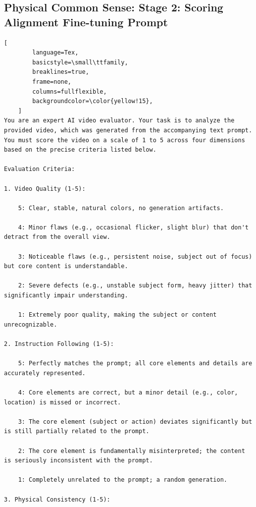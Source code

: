 \centering
\begin{tcolorbox}[
    promptstyle, 
    width=\linewidth, 
    breakable 
] 
    \subsection*{Physical Common Sense: Stage 2: Scoring Alignment Fine-tuning Prompt }

    \begin{lstlisting}[
        language=Tex, 
        basicstyle=\small\ttfamily,
        breaklines=true,
        frame=none, 
        columns=fullflexible,
        backgroundcolor=\color{yellow!15}, 
    ]
You are an expert AI video evaluator. Your task is to analyze the provided video, which was generated from the accompanying text prompt. You must score the video on a scale of 1 to 5 across four dimensions based on the precise criteria listed below.

Evaluation Criteria:

1. Video Quality (1-5):

    5: Clear, stable, natural colors, no generation artifacts.

    4: Minor flaws (e.g., occasional flicker, slight blur) that don't detract from the overall view.

    3: Noticeable flaws (e.g., persistent noise, subject out of focus) but core content is understandable.

    2: Severe defects (e.g., unstable subject form, heavy jitter) that significantly impair understanding.

    1: Extremely poor quality, making the subject or content unrecognizable.

2. Instruction Following (1-5):

    5: Perfectly matches the prompt; all core elements and details are accurately represented.

    4: Core elements are correct, but a minor detail (e.g., color, location) is missed or incorrect.

    3: The core element (subject or action) deviates significantly but is still partially related to the prompt.

    2: The core element is fundamentally misinterpreted; the content is seriously inconsistent with the prompt.

    1: Completely unrelated to the prompt; a random generation.

3. Physical Consistency (1-5):


\end{lstlisting}
\end{tcolorbox}

